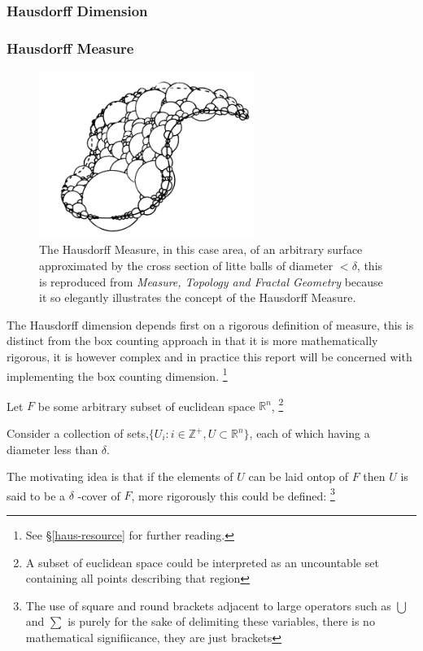 \documentclass[11pt]{article}
\begin{document}
\subsubsection{Hausdorff Dimension}
\label{Hausdorff-dimension}
\subsubsection{Hausdorff Measure}
\label{hausdorff-measure}
\begin{figure}
\centering
\includegraphics[width=7cm]{media/edgar_181_of_292.png}
\caption{\label{fig:ball-covering}The Hausdorff Measure, in this case area, of an arbitrary surface approximated by the cross section of litte balls of diameter \(< \delta\), this is reproduced from \emph{Measure, Topology and Fractal Geometry} \cite[p. 166]{edgarMeasureTopologyFractal2008a} because it so elegantly illustrates the concept of the Hausdorff Measure.}
\end{figure}


The Hausdorff dimension depends first on a rigorous definition of measure, this is distinct from the box counting approach in that it is more mathematically rigorous, it is however complex and in practice this report will be concerned with implementing the box counting dimension. \footnote{See \S \ref{haus-resource} for further reading.}

Let \(F\) be some arbitrary subset of euclidean space \(\mathbb{R}^n\), \footnote{A subset of euclidean space could be interpreted as an uncountable set containing all points describing that region}

Consider a collection of sets,\(\{U_i: i \in \mathbb{Z}^{+}, U\subset \mathbb{R}^{n}\}\), each of which having a
diameter less than \(\delta\).



The motivating idea is that if the elements of \(U\) can be laid ontop of
\(F\) then \(U\) is said to be a \(\delta\) -cover of \(F\), more rigorously this could be defined: \footnote{The use of square and round brackets adjacent to large operators such as \(\bigcup\) and \(\sum\) is purely for the sake of delimiting these variables, there is no mathematical signifiicance, they are just brackets}
\end{document}
